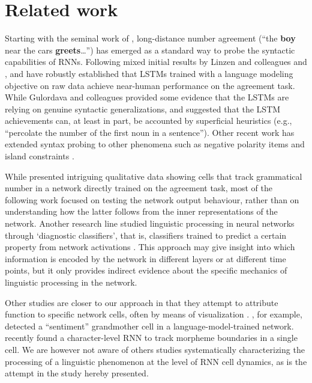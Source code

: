 
\section{Related work}

Starting with the seminal work of ,
long-distance number agreement (``the \textbf{boy} near the cars
\textbf{greets}\ldots'') has emerged as a standard way to probe the
syntactic capabilities of RNNs. Following
mixed initial results by Linzen and colleagues and
,  and
 have robustly established that LSTMs
trained with a language modeling objective on raw data achieve
near-human performance on the agreement task. While Gulordava and
colleagues provided some evidence that the LSTMs are relying on
genuine syntactic generalizations,  and
 suggested that the LSTM achievements
can, at least in part, be accounted by superficial heuristics (e.g., ``percolate the number of the first noun in a sentence''). Other
recent work has extended syntax probing to other phenomena such as
negative polarity items and island constraints
\cite{Chowdhury:Zamparelli:2018,jumelet2018language,marvin2018targeted,wilcox2018rnn}.

While  presented intriguing qualitative data
showing cells that track grammatical number in a network directly trained on
the agreement task, most of the following work focused on testing the
network output behaviour, rather than on understanding how the latter
follows from the inner representations of the network. Another research line
studied linguistic processing in neural networks through `diagnostic classifiers', that is, classifiers trained to
predict a certain property from network activations
\cite[e.g.,][]{gelderloos2016phonemes,Adi:etal:2017,alain2017understanding,Hupkes:etal:2017}. This approach may give insight into which information is encoded by the
network in different layers or at different time points, but it only
provides indirect evidence about the specific mechanics of linguistic
processing in the network.

Other studies are closer to our approach in that they attempt to
attribute function to specific network cells, often by means of
visualization
\cite{Karpathy:etal:2016,li2016visualizing,tang2017memory}. ,
for example, detected a ``sentiment'' grandmother cell in a
language-model-trained network.  
recently found a character-level RNN to track morpheme boundaries in a
single cell. We are however not aware of others studies systematically
characterizing the processing of a linguistic phenomenon at the level of
RNN cell dynamics, as is the attempt in the study hereby presented.